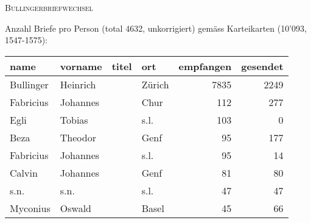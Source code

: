 

\usepackage{caption}
\usepackage{subcaption}




\usepackage{booktabs}
\usepackage{longtable}
\usepackage{tabu}


\sloppy  %

\noindent
{\LARGE \textsc{Bullingerbriefwechsel}}

\vspace{0.3cm}
\noindent
Anzahl Briefe pro Person (total 4632, unkorrigiert) gemäss Karteikarten (10'093, 1547-1575):

\vspace{-0.5cm}
\begin{center}
\begin{tiny}

\setlength\LTleft{0pt}
\setlength\LTright{0pt}
\begin{longtabu}{llllrr}
\toprule
                     name &                            vorname &       titel &                                         ort &  empfangen &  gesendet \\
\midrule
                Bullinger &                           Heinrich &            &                                      Zürich &       7835 &      2249 \\
                Fabricius &                           Johannes &             &                                        Chur &        112 &       277 \\
                     Egli &                             Tobias &             &                                        s.l. &        103 &         0 \\
                     Beza &                            Theodor &             &                                        Genf &         95 &       177 \\
                Fabricius &                           Johannes &             &                                        s.l. &         95 &        14 \\
                   Calvin &                           Johannes &             &                                        Genf &         81 &        80 \\
                     s.n. &                               s.n. &             &                                        s.l. &         47 &        47 \\
                 Myconius &                             Oswald &             &                                       Basel &         45 &        66 \\

\end{longtabu}
\end{tiny}
\end{center}
